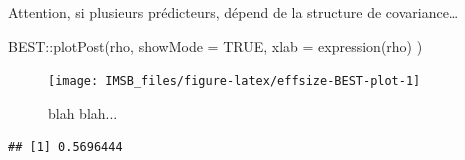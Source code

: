 \documentclass[
  a4paper,11pt,twoside,onecolumn,openright,final,oldfontcommands]{memoir}
\newenvironment{Shaded}{\begin{snugshade}}{\end{snugshade}}
\newcommand{\AttributeTok}[1]{\textcolor[rgb]{0.77,0.63,0.00}{#1}}
\newcommand{\ConstantTok}[1]{\textcolor[rgb]{0.00,0.00,0.00}{#1}}
\newcommand{\DecValTok}[1]{\textcolor[rgb]{0.00,0.00,0.81}{#1}}
\newcommand{\FunctionTok}[1]{\textcolor[rgb]{0.00,0.00,0.00}{#1}}
\newcommand{\NormalTok}[1]{#1}
\newcommand{\OtherTok}[1]{\textcolor[rgb]{0.56,0.35,0.01}{#1}}
\newcommand{\SpecialCharTok}[1]{\textcolor[rgb]{0.00,0.00,0.00}{#1}}
\theoremstyle{definition}
\theoremstyle{definition}
\theoremstyle{definition}
\theoremstyle{definition}
\theoremstyle{remark}
\begin{document}
\begin{Shaded}
\end{Shaded}

Attention, si plusieurs prédicteurs, dépend de la structure de covariance\ldots{}

\begin{Shaded}
\begin{Highlighting}[]
\NormalTok{BEST}\SpecialCharTok{::}\FunctionTok{plotPost}\NormalTok{(rho, }\AttributeTok{showMode =} \ConstantTok{TRUE}\NormalTok{, }\AttributeTok{xlab =} \FunctionTok{expression}\NormalTok{(rho) )}
\end{Highlighting}
\end{Shaded}

\begin{figure}[!htb]

{\centering \texttt{[image: IMSB\_files/figure-latex/effsize-BEST-plot-1]} 

}

\caption{blah blah...}\label{fig:effsize-BEST-plot}
\end{figure}

\begin{Shaded}
\end{Shaded}

\begin{verbatim}
## [1] 0.5696444
\end{verbatim}
\end{document}
